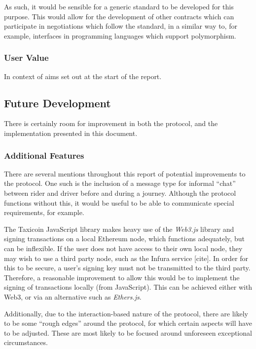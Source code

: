 As such, it would be sensible for a generic standard to be developed for this purpose. This would allow for the development of other contracts which can participate in negotiations which follow the standard, in a similar way to, for example, interfaces in programming languages which support polymorphism.

\subsubsection{User Value}

In context of aims set out at the start of the report.

\subsection{Future Development}

There is certainly room for improvement in both the protocol, and the implementation presented in this document.

\subsubsection{Additional Features}

There are several mentions throughout this report of potential improvements to the protocol. One such is the inclusion of a message type for informal \enquote{chat} between rider and driver before and during a journey. Although the protocol functions without this, it would be useful to be able to communicate special requirements, for example.

The Taxicoin JavaScript library makes heavy use of the \textit{Web3.js} library and signing transactions on a local Ethereum node, which functions adequately, but can be inflexible. If the user does not have access to their own local node, they may wish to use a third party node, such as the Infura service [cite]. In order for this to be secure, a user's signing key must not be transmitted to the third party. Therefore, a reasonable improvement to allow this would be to implement the signing of transactions locally (from JavaScript). This can be achieved either with Web3, or via an alternative such as \textit{Ethers.js}.

Additionally, due to the interaction-based nature of the protocol, there are likely to be some \enquote{rough edges} around the protocol, for which certain aspects will have to be adjusted. These are most likely to be focused around unforeseen exceptional circumstances.

